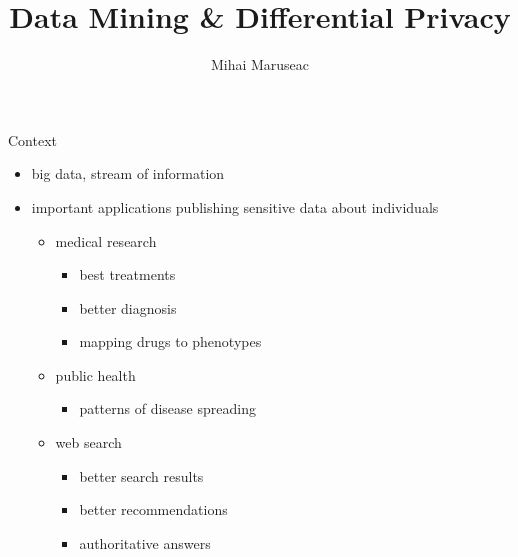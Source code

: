 \documentclass{beamer}
\title{Data Mining \& Differential Privacy}
\author{Mihai Maruseac}
\begin{document}
\maketitle

\begin{frame}{Context}
  \begin{itemize}[<+->]
    \item big data, stream of information
    \item important applications publishing sensitive data about individuals
      \begin{itemize}
        \item medical research
          \begin{itemize}
            \item best treatments
            \item better diagnosis
            \item mapping drugs to phenotypes
          \end{itemize}
        \item public health
          \begin{itemize}
            \item patterns of disease spreading
          \end{itemize}
        \item web search
          \begin{itemize}
            \item better search results
            \item better recommendations
            \item authoritative answers
          \end{itemize}
      \end{itemize}
  \end{itemize}
\end{frame}
\end{document}

